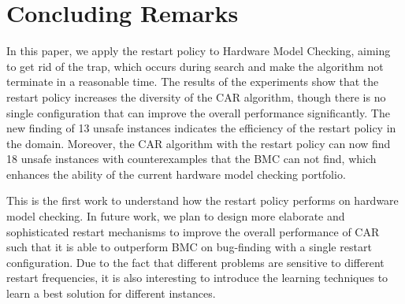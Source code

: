 \section{Concluding Remarks}
In this paper, we apply the restart policy to Hardware Model Checking, aiming to get rid of the trap, which occurs during search and make the algorithm not terminate in a reasonable time. The results of the experiments show that the restart policy increases the diversity of the CAR algorithm, though there is no single configuration that can improve the overall performance significantly. The new finding of 13 unsafe instances indicates the efficiency of the restart policy in the domain. Moreover, the CAR algorithm with the restart policy can now find 18 unsafe instances with counterexamples that the BMC can not find, which enhances the ability of the current hardware model checking portfolio. 

This is the first work to understand how the restart policy performs on hardware model checking.
In future work, we plan to design more elaborate and sophisticated restart mechanisms to improve the overall performance of CAR such that it is able to outperform BMC on bug-finding with a single restart configuration. Due to the fact that different problems are sensitive to different restart frequencies, it is also interesting to introduce the learning techniques to learn a best solution for different instances. 


